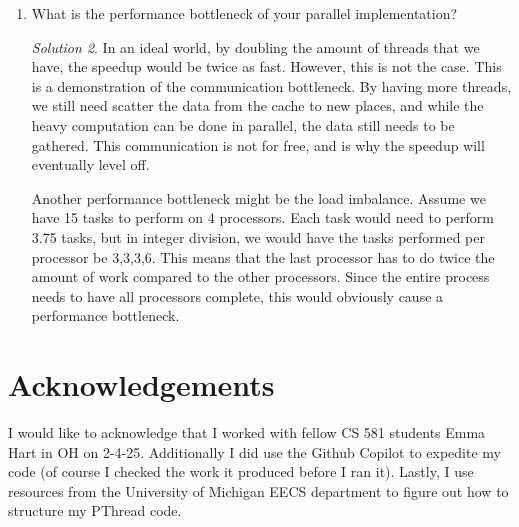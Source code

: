 \documentclass[a4paper,12pt]{article}
\theoremstyle{definition}
\theoremstyle{remark}
\newtheorem*{solution}{Solution}
\begin{document}
\begin{enumerate}
\begin{solution}
				For the PThreads code, I once again divided up the outer-most for loop to make sure that there was no need for a mutex. Since the outer for loop was over the batches, I essentially divided the total number of batches by the number of threads to determine the start and end batches that each thread would do. On the last thread, I changed the end batches to the last batch to ensure that no batch was left undone. Since the batches are independent, the concurrent reads and writes were essentially independent processes.
				
			\end{solution}
			\item What is the performance bottleneck of your parallel implementation?
			\begin{solution}
				In an ideal world, by doubling the amount of threads that we have, the speedup would be twice as fast. However, this is not the case. This is a demonstration of the communication bottleneck. By having more threads, we still need scatter the data from the cache to new places, and while the heavy computation can be done in parallel, the data still needs to be gathered. This communication is not for free, and is why the speedup will eventually level off.
				
				Another performance bottleneck might be the load imbalance. Assume we have 15 tasks to perform on 4 processors. Each task would need to perform 3.75 tasks, but in integer division, we would have the tasks performed per processor be 3,3,3,6. This means that the last processor has to do twice the amount of work compared to the other processors. Since the entire process needs to have all processors complete, this would obviously cause a performance bottleneck.
			\end{solution}
		\end{enumerate}
		
		
	
	\section*{Acknowledgements}
	I would like to acknowledge that I worked with fellow CS 581 students Emma Hart in OH on 2-4-25. Additionally I did use the Github Copilot to expedite my code (of course I checked the work it produced before I ran it). Lastly, I use resources from the University of Michigan EECS department to figure out how to structure my PThread code.
	
\end{document}
